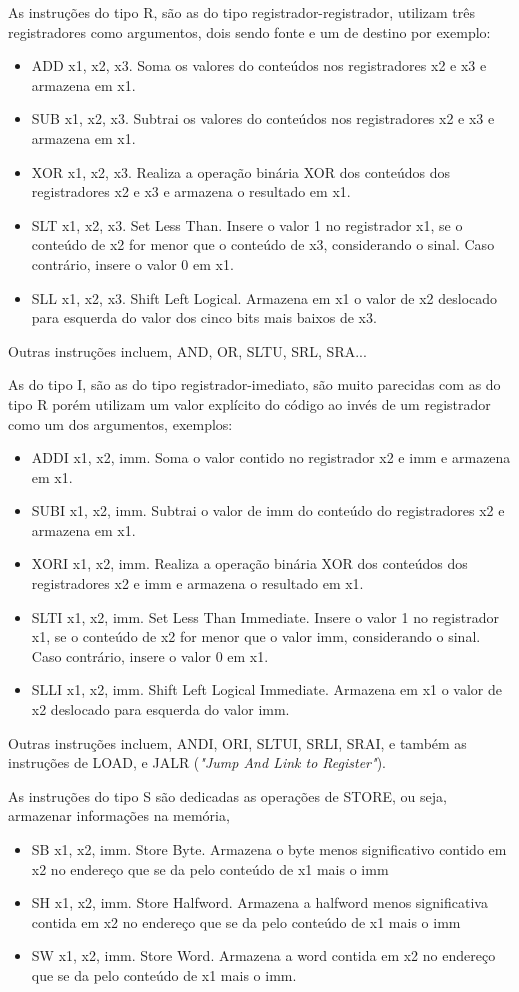 		As instruções do tipo R, são as do tipo registrador-registrador, utilizam três registradores como argumentos, dois sendo fonte e um de destino por exemplo:
		\begin{itemize}
			\item{ADD x1, x2, x3. Soma os valores do conteúdos nos registradores x2 e x3 e armazena em x1.}
			\item{SUB x1, x2, x3. Subtrai os valores do conteúdos nos registradores x2 e x3 e armazena em x1.}
			\item{XOR x1, x2, x3. Realiza a operação binária XOR dos conteúdos dos registradores x2 e x3 e armazena o resultado em x1.}
			\item{SLT x1, x2, x3. Set Less Than. Insere o valor 1 no registrador x1, se o conteúdo de x2 for menor que o conteúdo de x3, considerando o sinal. Caso contrário, insere o valor 0 em x1.}
			\item{SLL x1, x2, x3. Shift Left Logical. Armazena em x1 o valor de x2 deslocado para esquerda do valor dos cinco bits mais baixos de x3.}				
		\end{itemize}
		Outras instruções incluem, AND, OR, SLTU, SRL, SRA...

		As do tipo I, são as do tipo registrador-imediato, são muito parecidas com as do tipo R porém utilizam um valor explícito do código ao invés de um registrador como um dos argumentos, exemplos:
		\begin{itemize}
			\item{ADDI x1, x2, imm. Soma o valor contido no registrador x2 e imm e armazena em x1.}
			\item{SUBI x1, x2, imm. Subtrai o valor de imm do conteúdo do registradores x2 e armazena em x1.}
			\item{XORI x1, x2, imm. Realiza a operação binária XOR dos conteúdos dos registradores x2 e imm e armazena o resultado em x1.}
			\item{SLTI x1, x2, imm. Set Less Than Immediate. Insere o valor 1 no registrador x1, se o conteúdo de x2 for menor que o valor imm, considerando o sinal. Caso contrário, insere o valor 0 em x1.}
			\item{SLLI x1, x2, imm. Shift Left Logical Immediate. Armazena em x1 o valor de x2 deslocado para esquerda do valor imm.}
		\end{itemize}
		Outras instruções incluem, ANDI, ORI, SLTUI, SRLI, SRAI, e também as instruções de LOAD, e JALR (\textit{"Jump And Link to Register"}).

		As instruções do tipo S são dedicadas as operações de STORE, ou seja, armazenar informações na memória,
		\begin{itemize}
			\item{SB x1, x2, imm. Store Byte. Armazena o byte menos significativo contido em x2 no endereço que se da pelo conteúdo de x1 mais o imm}
			\item{SH x1, x2, imm. Store Halfword. Armazena a halfword menos significativa contida em x2 no endereço que se da pelo conteúdo de x1 mais o imm}
			\item{SW x1, x2, imm. Store Word. Armazena a word contida em x2 no endereço que se da pelo conteúdo de x1 mais o imm.}
		\end{itemize}

